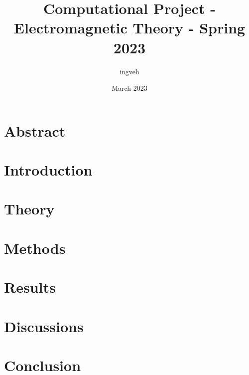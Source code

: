 \documentclass{article}
\title{Computational Project - Electromagnetic Theory - Spring 2023}
\author{ingveh }
\date{March 2023}
\begin{document}
\maketitle

\section{Abstract}


\section{Introduction}


\section{Theory}


\section{Methods}


\section{Results}


\section{Discussions}


\section{Conclusion}

\end{document}

